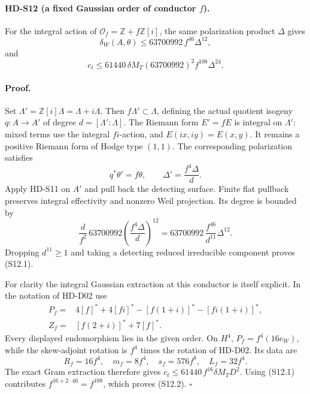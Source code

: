 \paragraph{HD-S12 (a fixed Gaussian order of conductor \(f\)).}
For the integral action of
\(\mathcal O_f=\mathbb Z+f\mathbb Z[i]\), the same polarization
product \(\Delta\) gives
\[
 \boxed{\delta_W(A,\theta)\le
        63700992\,f^{46}\Delta^{12},}                       \tag{S12.1}
\]
and
\[
 \boxed{c_t\le61440\,\delta M_T
        (63700992)^2 f^{108}\Delta^{24}.}                  \tag{S12.2}
\]

\paragraph{Proof.}
Set \(\Lambda'=\mathbb Z[i]\Lambda=\Lambda+i\Lambda\).
Then \(f\Lambda'\subset\Lambda\), defining the actual quotient
isogeny \(q:A\to A'\) of degree \(d=[\Lambda':\Lambda]\).
The Riemann form \(E'=fE\) is integral on \(\Lambda'\):
mixed terms use the integral \(fi\)-action, and
\(E(ix,iy)=E(x,y)\). It remains a positive Riemann form of Hodge type $(1,1)$.
The corresponding polarization satisfies
\[
 q^*\theta'=f\theta,\qquad \Delta'=\frac{f^4\Delta}{d}.
\]
Apply HD-S11 on \(A'\) and pull back the detecting surface.
Finite flat pullback preserves integral effectivity and nonzero
Weil projection. Its degree is bounded by
\[
 \frac d{f^2}\,63700992\left(\frac{f^4\Delta}{d}\right)^{12}
 =63700992\,\frac{f^{46}}{d^{11}}\Delta^{12}.
\]
Dropping \(d^{11}\ge1\) and taking a detecting reduced irreducible
component proves (S12.1).

For clarity the integral Gaussian extraction at this conductor
is itself explicit. In the notation of HD-D02 use
\[
 \begin{split}
 P_f={}&4[f]^*+4[fi]^*
       -[f(1+i)]^*-[fi(1+i)]^*,\\
 Z_f={}&[f(2+i)]^*+7[f]^*.
 \end{split}
\]
Every displayed endomorphism lies in the given order. On \(H^4\),
\(P_f=f^4(16e_W)\), while the skew-adjoint rotation is \(f^4\)
times the rotation of HD-D02. Its data are
\[
 R_f=16f^4,\quad m_f=8f^4,\quad
 s_f=576f^8,\quad L_f=32f^4.
\]
The exact Gram extraction therefore gives
\(c_t\le61440\,f^{16}\delta M_T D^2\).
Using (S12.1) contributes \(f^{16+2\cdot46}=f^{108}\),
which proves (S12.2). \(\square\)


